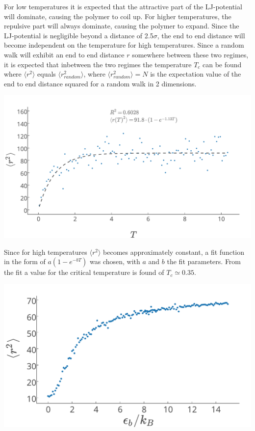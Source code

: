 For low temperatures it is expected that the attractive part of the LJ-potential will dominate, causing the polymer to coil up. For higher temperatures, the repulsive part will always dominate, causing the polymer to expand. Since the LJ-potential is negligible beyond a distance of 2.5$\sigma$, the end to end distance will become independent on the temperature for high temperatures. Since a random walk will exhibit an end to end distance $r$ somewhere between these two regimes, it is expected that inbetween the two regimes the temperature $T_c$ can be found where $\langle r^2 \rangle$ equals $\langle r_{random}^2 \rangle$, where $\langle r_{random}^2 \rangle = N$ is the expectation value of the end to end distance squared for a random walk in 2 dimensions.
\begin{Figure}
  \centerfloat
     \includegraphics[scale=0.4]{end_to_end_distance_as_function_of_the_temperature.pdf}
 \label{fig:end_to_end_afo_temperature}
\end{Figure} Since for high temperatures $\langle r^2 \rangle$ becomes approximately constant, a fit function in the form of $a(1-e^{-bT})$ was chosen, with $a$ and $b$ the fit parameters. From the fit a value for the critical temperature is found of $T_c \simeq 0.35$.

\begin{Figure}
  \centerfloat
     \includegraphics[scale=0.4]{radius_of_gyr_bending.pdf}
 \label{fig:radius_of_gyr_bending}
\end{Figure}

